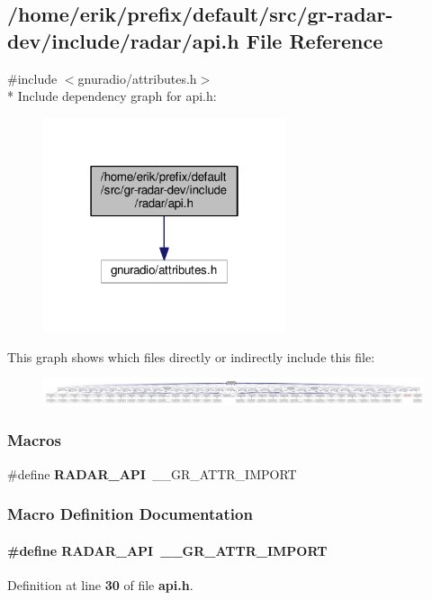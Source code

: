 \subsection{/home/erik/prefix/default/src/gr-\/radar-\/dev/include/radar/api.h File Reference}
\label{api_8h}
{\ttfamily \#include $<$gnuradio/attributes.\+h$>$}\\*
Include dependency graph for api.\+h\+:
\nopagebreak
\begin{figure}[H]
\begin{center}
\leavevmode
\includegraphics[width=202pt]{df/df0/api_8h__incl}
\end{center}
\end{figure}
This graph shows which files directly or indirectly include this file\+:
\nopagebreak
\begin{figure}[H]
\begin{center}
\leavevmode
\includegraphics[width=350pt]{d5/d4b/api_8h__dep__incl}
\end{center}
\end{figure}
\subsubsection*{Macros}
\begin{DoxyCompactItemize}
\item 
\#define {\bf R\+A\+D\+A\+R\+\_\+\+A\+PI}~\+\_\+\+\_\+\+G\+R\+\_\+\+A\+T\+T\+R\+\_\+\+I\+M\+P\+O\+RT
\end{DoxyCompactItemize}


\subsubsection{Macro Definition Documentation}
\paragraph[{R\+A\+D\+A\+R\+\_\+\+A\+PI}]{\setlength{\rightskip}{0pt plus 5cm}\#define R\+A\+D\+A\+R\+\_\+\+A\+PI~\+\_\+\+\_\+\+G\+R\+\_\+\+A\+T\+T\+R\+\_\+\+I\+M\+P\+O\+RT}\label{api_8h_a087f3342c4b5ef356c6a607f77df0ea4}


Definition at line {\bf 30} of file {\bf api.\+h}.

